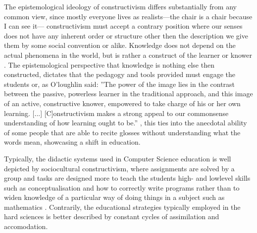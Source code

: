 The epistemological ideology of constructivism differs substantially from any common view, since mostly everyone lives as realists---the chair is a chair because I can see it--- %
constructivism must accept a contrary position where our senses does not have any inherent order or structure other then the description we give them by some social convention or alike. Knowledge does not depend on the actual phenomena in the world, but is rather a construct of the learner or knower \cite[p.49]{imsen_2005}. The epistemological perspective that knowledge is nothing else then constructed, dictates that the pedagogy and tools provided must engage the students or, as O'loughlin said: 
''The power of the image lies in the contrast between the passive, powerless learner in the traditional approach, and this 
image of an active, constructive knower, empowered to take charge of his or her own learning. [...] [C]onstructivism makes a strong appeal to our commonsense understanding of how learning ought to be.'' \cite[p.792]{oloughlin_2007}, this ties into the anecdotal ability of some people that are able to recite glosses without understanding what the words mean, showcasing a shift in education.


Typically, the didactic systems used in Computer Science education is well depicted by sociocultural constructivism, where assignments are solved by a group and tasks are designed more to teach the students high- and lowlevel skills such as conceptualisation and how to correctly write programs rather than to widen knowledge of a particular way of doing things in a subject such as mathematics \cite{jenkins_2001}. 
Contrarily, the educational strategies typically employed in the hard sciences is better described by constant cycles of assimilation and accomodation. 




